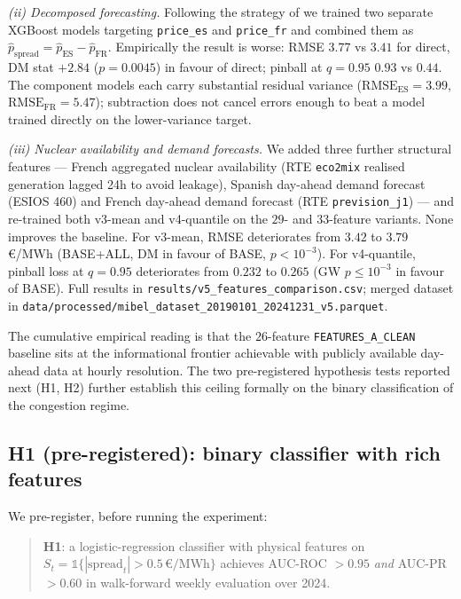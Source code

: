 \documentclass[11pt,a4paper]{article}
\begin{document}
\emph{(ii) Decomposed forecasting.} Following the strategy of
\citet{Lago2021} we trained two separate XGBoost models targeting
\texttt{price\_es} and \texttt{price\_fr} and combined them as
$\hat{p}_{\text{spread}} = \hat{p}_{\text{ES}} -
\hat{p}_{\text{FR}}$. Empirically the result is worse: RMSE
$3.77$ vs $3.41$ for direct, DM stat $+2.84$
($p = 0.0045$) in favour of direct; pinball at $q = 0.95$
$0.93$ vs $0.44$. The component models each carry
substantial residual variance ($\mathrm{RMSE}_{\text{ES}} = 3.99$,
$\mathrm{RMSE}_{\text{FR}} = 5.47$); subtraction does not cancel
errors enough to beat a model trained directly on the lower-variance
target.

\emph{(iii) Nuclear availability and demand forecasts.} We added
three further structural features --- French aggregated nuclear
availability (RTE \texttt{eco2mix} realised generation lagged 24h
to avoid leakage), Spanish day-ahead demand forecast (ESIOS 460) and
French day-ahead demand forecast (RTE \texttt{prevision\_j1}) ---
and re-trained both v3-mean and v4-quantile on the $29$- and
$33$-feature variants. None improves the baseline. For v3-mean,
RMSE deteriorates from $3.42$ to $3.79$ €/MWh (BASE+ALL,
DM in favour of BASE, $p < 10^{-3}$). For v4-quantile, pinball
loss at $q = 0.95$ deteriorates from $0.232$ to $0.265$
(GW $p \leq 10^{-3}$ in favour of BASE).
Full results in \texttt{results/v5\_features\_comparison.csv};
merged dataset in \texttt{data/processed/mibel\_dataset\_20190101\_20241231\_v5.parquet}.

The cumulative empirical reading is that the $26$-feature
\texttt{FEATURES\_A\_CLEAN} baseline sits at the informational
frontier achievable with publicly available day-ahead data at hourly
resolution. The two pre-registered hypothesis tests reported next
(H1, H2) further establish this ceiling formally on the binary
classification of the congestion regime.

\subsection{H1 (pre-registered): binary classifier with rich features}\label{sec:h1}

We pre-register, before running the experiment:

\begin{quote}
\textbf{H1}: a logistic-regression classifier with physical features
on $S_t = \mathbb{1}\{|\mathrm{spread}_t| > 0.5\,\text{€/MWh}\}$
achieves AUC-ROC $> 0.95$ \emph{and} AUC-PR $> 0.60$ in walk-forward
weekly evaluation over 2024.
\end{quote}
\end{document}
